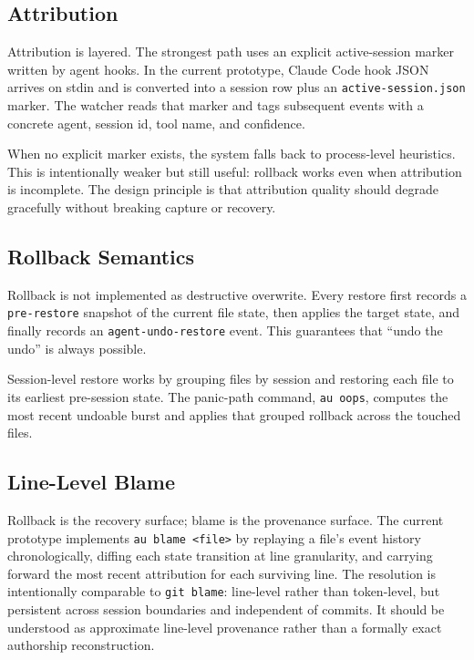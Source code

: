 \documentclass[10pt,a4paper]{article}
\begin{document}
\subsection{Attribution}

Attribution is layered. The strongest path uses an explicit active-session
marker written by agent hooks. In the current prototype, Claude Code hook JSON
arrives on stdin and is converted into a session row plus an
\texttt{active-session.json} marker. The watcher reads that marker and tags
subsequent events with a concrete agent, session id, tool name, and confidence.

When no explicit marker exists, the system falls back to process-level
heuristics. This is intentionally weaker but still useful: rollback works even
when attribution is incomplete. The design principle is that attribution quality
should degrade gracefully without breaking capture or recovery.

\subsection{Rollback Semantics}

Rollback is not implemented as destructive overwrite. Every restore first
records a \texttt{pre-restore} snapshot of the current file state, then applies
the target state, and finally records an \texttt{agent-undo-restore} event.
This guarantees that ``undo the undo'' is always possible.

Session-level restore works by grouping files by session and restoring each file
to its earliest pre-session state. The panic-path command, \texttt{au oops},
computes the most recent undoable burst and applies that grouped rollback
across the touched files.

\subsection{Line-Level Blame}

Rollback is the recovery surface; blame is the provenance surface. The current
prototype implements \texttt{au blame <file>} by replaying a file's event
history chronologically, diffing each state transition at line granularity, and
carrying forward the most recent attribution for each surviving line. The
resolution is intentionally comparable to \texttt{git blame}: line-level rather
than token-level, but persistent across session boundaries and independent of
commits. It should be understood as approximate line-level provenance rather
than a formally exact authorship reconstruction.
\end{document}
